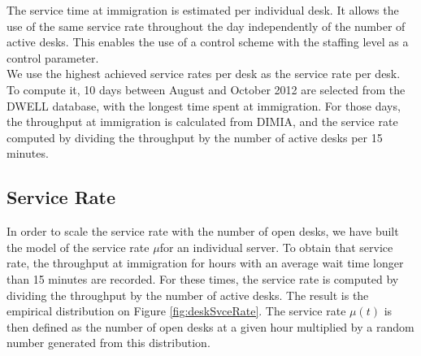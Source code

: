 \documentclass[11pt,onecolumn]{IEEEtran}
\begin{document}
The service time at immigration is estimated per individual desk. 
It allows the use of the same service rate throughout the day independently of the number of active desks.
This enables the use of a control scheme with the staffing level as a control parameter.\\

We use the highest achieved service rates per desk as the service rate per desk. To compute it, 10 days between August and October 2012 are selected from the DWELL database, with the longest time spent at immigration. For those days, the throughput at immigration is calculated from DIMIA, and the service rate computed by dividing the throughput by the number of active desks per 15 minutes. 


\subsection{Service Rate}
In order to scale the service rate with the number of open desks, we have built the model of the service rate $\mu$for an individual server.
To obtain that service rate, the throughput at immigration for hours with an average wait time longer than 15 minutes are recorded. For these times,  the service rate is computed by dividing the throughput by the number of active desks. 
The result is the empirical distribution on Figure \ref{fig:deskSvceRate}.
The service rate $\mu(t)$ is then defined as the number of open desks at a given hour multiplied by a random number generated from this distribution.
\end{document}
